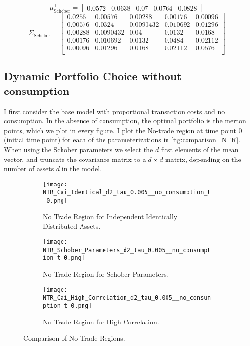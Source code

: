 \documentclass[11pt]{article}
\begin{document}
\[
\mu_{\text{Schober}}^\top = 
\begin{bmatrix}
0.0572 & 0.0638 & 0.07 & 0.0764 & 0.0828
\end{bmatrix}
\]
\[
\Sigma_{\text{Schober}} = 
\begin{bmatrix}
0.0256 & 0.00576 & 0.00288 & 0.00176 & 0.00096 \\
0.00576 & 0.0324 & 0.0090432 & 0.010692 & 0.01296 \\
0.00288 & 0.0090432 & 0.04 & 0.0132 & 0.0168 \\
0.00176 & 0.010692 & 0.0132 & 0.0484 & 0.02112 \\
0.00096 & 0.01296 & 0.0168 & 0.02112 & 0.0576 \\
\end{bmatrix}
\]

\subsection{Dynamic Portfolio Choice without consumption} \label{Subsection: Results_NoConsumption}
I first consider the base model with proportional transaction costs
and no consumption. In the absence of consumption, the optimal portfolio is the merton points, which we plot in every figure.
I plot the No-trade region at time point 0 (initial time point) for each of the parameterizations in \autoref{fig:comparison_NTR}.
When using the Schober parameters we select the $d$ first elements of the mean vector, and truncate the covariance matrix to a $d \times d$ matrix,
depending on the number of assets $d$ in the model.
\begin{figure}[!ht]
    \centering
    \begin{subfigure}[t]{\textwidth}
        \centering
        \texttt{[image: NTR\_Cai\_Identical\_d2\_tau\_0.005\_\_no\_consumption\_t\_0.png]}
        \caption{No Trade Region for Independent Identically Distributed Assets.}
        \label{fig:NTR_2d_iid}
    \end{subfigure}

    \vspace{1em}

    \begin{subfigure}[t]{0.48\textwidth}
        \centering
        \texttt{[image: NTR\_Schober\_Parameters\_d2\_tau\_0.005\_\_no\_consumption\_t\_0.png]}
        \caption{No Trade Region for Schober Parameters.}
        \label{fig:NTR_2d_Schober}
    \end{subfigure}%
    \hfill
    \begin{subfigure}[t]{0.48\textwidth}
        \centering
        \texttt{[image: NTR\_Cai\_High\_Correlation\_d2\_tau\_0.005\_\_no\_consumption\_t\_0.png]}
        \caption{No Trade Region for High Correlation.}
        \label{fig:NTR_2d_High_Correlation}
    \end{subfigure}

    \caption{Comparison of No Trade Regions.}
    \label{fig:comparison_NTR}
\end{figure}
\end{document}
